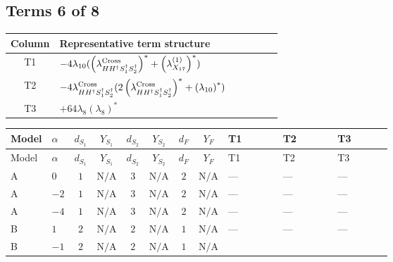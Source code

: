 \documentclass[8pt]{article}
\begin{document}
\begin{landscape}
\subsection*{Terms 6 of 8}
\begin{center}
\begin{tabular}{@{}c >{\raggedright\arraybackslash}p{0.82\linewidth}@{}}
\toprule
Column & Representative term structure \\
\midrule
T1 & \(\displaystyle -4 {\lambda_{10}} (\left({\lambda_{H H^\dagger S_1^\dagger S_2^\dagger}^{\rm Cross}}\right)^{*}+\left({\lambda_{X_{17}}^{(1)}}\right)^{*})\) \\
\midrule
T2 & \(\displaystyle -4 {\lambda_{H H^\dagger S_1^\dagger S_2^\dagger}^{\rm Cross}} (2 \left({\lambda_{H H^\dagger S_1^\dagger S_2^\dagger}^{\rm Cross}}\right)^{*}+\left({\lambda_{10}}\right)^{*})\) \\
\midrule
T3 & \(\displaystyle +64 {\lambda_{8}} \left({\lambda_{8}}\right)^{*}\) \\
\midrule
\bottomrule
\end{tabular}
\end{center}
\smallskip
\tiny
\begin{longtable}{@{}llcccccc >{\raggedright\arraybackslash}p{0.21\linewidth} >{\raggedright\arraybackslash}p{0.21\linewidth} >{\raggedright\arraybackslash}p{0.21\linewidth}@{}}
\toprule
Model & $\alpha$ & $d_{S_1}$ & $Y_{S_1}$ & $d_{S_2}$ & $Y_{S_2}$ & $d_F$ & $Y_F$ & T1 & T2 & T3 \\
\midrule
\endfirsthead
\toprule
Model & $\alpha$ & $d_{S_1}$ & $Y_{S_1}$ & $d_{S_2}$ & $Y_{S_2}$ & $d_F$ & $Y_F$ & T1 & T2 & T3 \\
\midrule
\endhead
A & $0$ & $1$ & $\text{N/A}$ & $3$ & $\text{N/A}$ & $2$ & $\text{N/A}$ & --- & --- & --- \\
\midrule
A & $-2$ & $1$ & $\text{N/A}$ & $3$ & $\text{N/A}$ & $2$ & $\text{N/A}$ & --- & --- & --- \\
\midrule
A & $-4$ & $1$ & $\text{N/A}$ & $3$ & $\text{N/A}$ & $2$ & $\text{N/A}$ & --- & --- & --- \\
\midrule
B & $1$ & $2$ & $\text{N/A}$ & $2$ & $\text{N/A}$ & $1$ & $\text{N/A}$ & --- & --- & --- \\
\midrule
B & $-1$ & $2$ & $\text{N/A}$ & $2$ & $\text{N/A}$ & $1$ & $\text{N/A}$ & \scriptsize\adjustbox{max width=\linewidth}{$\begin{gathered} -4 {\lambda_{10}} (\left({\lambda_{H H^\dagger S_1^\dagger S_2^\dagger}^{\rm Cross}}\right)^{*}+\left({\lambda_{X_{17}}^{(1)}}\right)^{*})\end{gathered}$} & \scriptsize\adjustbox{max width=\linewidth}{$\begin{gathered} -4 {\lambda_{H H^\dagger S_1^\dagger S_2^\dagger}^{\rm Cross}} (2 \left({\lambda_{H H^\dagger S_1^\dagger S_2^\dagger}^{\rm Cross}}\right)^{*}+\left({\lambda_{10}}\right)^{*})\end{gathered}$} & \scriptsize\adjustbox{max width=\linewidth}{$\begin{gathered} +64 {\lambda_{8}} \left({\lambda_{8}}\right)^{*}\end{gathered}$} \\

\end{longtable}
\end{landscape}
\end{document}
